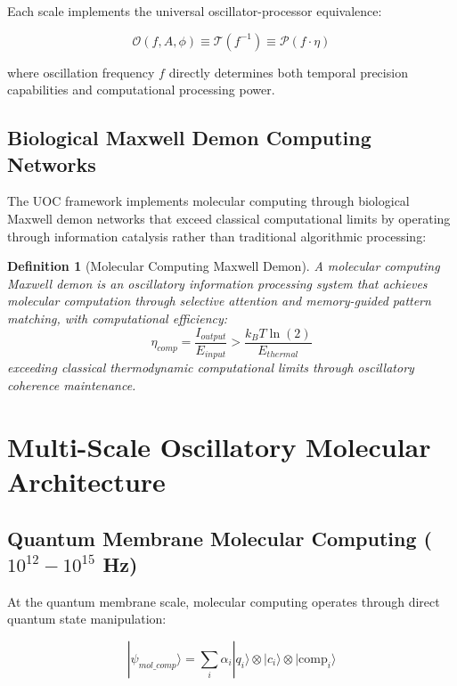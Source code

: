 \documentclass[12pt,a4paper]{article}
\newtheorem{definition}[theorem]{Definition}
\begin{document}
Each scale implements the universal oscillator-processor equivalence:

\begin{equation}
\mathcal{O}(f, A, \phi) \equiv \mathcal{T}(f^{-1}) \equiv \mathcal{P}(f \cdot \eta)
\end{equation}

where oscillation frequency $f$ directly determines both temporal precision capabilities and computational processing power.

\subsection{Biological Maxwell Demon Computing Networks}

The UOC framework implements molecular computing through biological Maxwell demon networks that exceed classical computational limits by operating through information catalysis rather than traditional algorithmic processing:

\begin{definition}[Molecular Computing Maxwell Demon]
A molecular computing Maxwell demon is an oscillatory information processing system that achieves molecular computation through selective attention and memory-guided pattern matching, with computational efficiency:
\begin{equation}
\eta_{comp} = \frac{I_{output}}{E_{input}} > \frac{k_B T \ln(2)}{E_{thermal}}
\end{equation}
exceeding classical thermodynamic computational limits through oscillatory coherence maintenance.
\end{definition}

\section{Multi-Scale Oscillatory Molecular Architecture}

\subsection{Quantum Membrane Molecular Computing ($10^{12}-10^{15}$ Hz)}

At the quantum membrane scale, molecular computing operates through direct quantum state manipulation:

\begin{equation}
|\psi_{mol\_comp}\rangle = \sum_{i} \alpha_i |q_i\rangle \otimes |c_i\rangle \otimes |\text{comp}_i\rangle
\end{equation}
\end{document}

